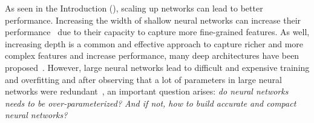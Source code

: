 






As seen in the Introduction (), scaling up networks can lead to better performance.
Increasing the width of shallow neural networks can increase their performance~\cite{howard2017mobilenets,sandler2018mobilenetv2,tan2019mnasnet,zagoruyko2016wide} due to their capacity to capture more fine-grained features.
As well, increasing depth is a common and effective approach to capture richer and more complex features and increase performance, many deep architectures have been proposed~\cite{he2016deep,huang2016deep, szegedy2016rethinking,szegedy2017inception,xiao2018dynamical}.
However, large neural networks lead to difficult and expensive training and overfitting and after observing that a lot of parameters in large neural networks were redundant~\cite{dai2018compressing,frankle2018lottery}, an important question arises: \emph{do neural networks needs to be over-parameterized? And if not, how to build accurate and compact neural networks?} 



